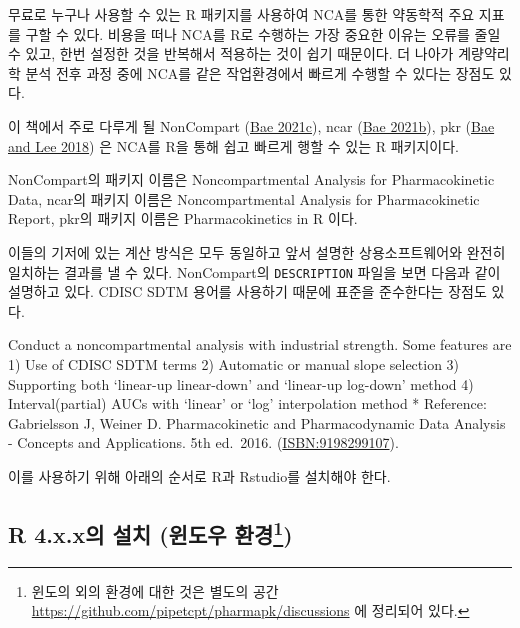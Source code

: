 \documentclass[
  11pt,
  krantz2, a4paper, twoside]{krantz}
\renewenvironment{quote}{\begin{VF}}{\end{VF}}
\theoremstyle{definition}
\theoremstyle{definition}
\theoremstyle{definition}
\theoremstyle{definition}
\theoremstyle{remark}
\begin{document}
무료로 누구나 사용할 수 있는 R 패키지를 사용하여 NCA를 통한 약동학적 주요 지표를 구할 수 있다. 비용을 떠나 NCA를 R로 수행하는 가장 중요한 이유는 오류를 줄일 수 있고, 한번 설정한 것을 반복해서 적용하는 것이 쉽기 때문이다. 더 나아가 계량약리학 분석 전후 과정 중에 NCA를 같은 작업환경에서 빠르게 수행할 수 있다는 장점도 있다.

이 책에서 주로 다루게 될 NonCompart (\protect\hyperlink{ref-R-NonCompart}{Bae 2021c}), ncar (\protect\hyperlink{ref-R-ncar}{Bae 2021b}), pkr (\protect\hyperlink{ref-R-pkr}{Bae and Lee 2018}) 은 NCA를 R을 통해 쉽고 빠르게 행할 수 있는 R 패키지이다.

NonCompart의 패키지 이름은 Noncompartmental Analysis for Pharmacokinetic Data,
ncar의 패키지 이름은 Noncompartmental Analysis for Pharmacokinetic Report,
pkr의 패키지 이름은 Pharmacokinetics in R 이다.

이들의 기저에 있는 계산 방식은 모두 동일하고 앞서 설명한 상용소프트웨어와 완전히 일치하는 결과를 낼 수 있다. NonCompart의 \texttt{DESCRIPTION} 파일을 보면 다음과 같이 설명하고 있다. CDISC SDTM 용어를 사용하기 때문에 표준을 준수한다는 장점도 있다.

\begin{quote}
Conduct a noncompartmental analysis with industrial strength.
Some features are
1) Use of CDISC SDTM terms
2) Automatic or manual slope selection
3) Supporting both `linear-up linear-down' and `linear-up log-down' method
4) Interval(partial) AUCs with `linear' or `log' interpolation method
* Reference: Gabrielsson J, Weiner D. Pharmacokinetic and Pharmacodynamic Data Analysis - Concepts and Applications. 5th ed.~2016. (\url{ISBN:9198299107}).
\end{quote}

이를 사용하기 위해 아래의 순서로 R과 Rstudio를 설치해야 한다.

\hypertarget{r-4.x.xuxc758-uxc124uxce58-uxc708uxb3c4uxc6b0-uxd658uxacbd}{%
\subsection[R 4.x.x의 설치 (윈도우 환경)]{\texorpdfstring{R 4.x.x의 설치 (윈도우 환경\footnote{윈도의 외의 환경에 대한 것은 별도의 공간 \url{https://github.com/pipetcpt/pharmapk/discussions} 에 정리되어 있다.})}{R 4.x.x의 설치 (윈도우 환경)}}\label{r-4.x.xuxc758-uxc124uxce58-uxc708uxb3c4uxc6b0-uxd658uxacbd}}
\end{document}
